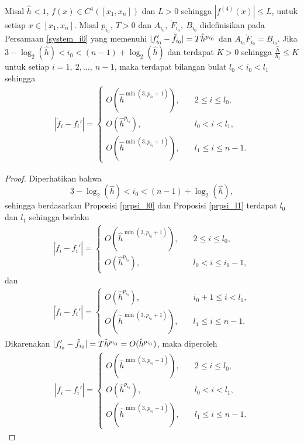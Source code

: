 \begin{akibat}\label{crlyR}
    Misal $\hat{h} < 1$, $f(x) \in C^4([x_{1},x_{n}])$ dan $L > 0$ sehingga \mbox{$|f^{(4)}(x)| \leq L$}, untuk setiap $x\in[x_{1},x_{n}]$. Misal $p_{i_0},~T>0$ dan $A_{i_0},~\dot{F}_{i_0},~B_{i_0}$ didefinisikan pada Persamaan \eqref{system_i0} yang memenuhi $|f_{i_0}'-\Tilde{f}_{i_0}|=T\hat{h}^{p_{i_0}}$ dan $A_{i_0}\dot{F}_{i_0} = B_{i_0}$. Jika $3 - \log_2(\hat{h}) < i_0 < (n - 1) + \log_2(\hat{h})$ dan terdapat $K>0$ sehingga $\frac{\hat{h}}{h_i} \leq K$ untuk setiap $i=1,~2,\dots,~n-1$, maka terdapat bilangan bulat $l_0<i_0<l_1$ sehingga
    \begin{align*}
            |\dot{f}_i-f_i'|=
        \begin{cases}
        O(\hat{h}^{\min(3,p_{i_0}+1)}), \quad &2 \leq i\leq l_0, \\
        O(\hat{h}^{p_{i_0}}), &l_0 < i< l_1,\\
        O(\hat{h}^{\min(3,p_{i_0}+1)}), \quad &l_1 \leq i\leq n-1.
        \end{cases}
    \end{align*}
\end{akibat}

\begin{proof}
    Diperhatikan bahwa 
    $$3 - \log_2(\hat{h}) < i_0 < (n - 1) + \log_2(\hat{h}),$$ 
    sehingga berdasarkan Proposisi \ref{prpsi_l0} dan Proposisi \ref{prpsi_l1} terdapat $l_0$ dan $l_1$ sehingga berlaku
    \begin{align*}
    |\dot{f}_i-f_i'|=
        \begin{cases}
        O(\hat{h}^{\min(3,p_{i_0}+1)}), \quad &2 \leq i\leq l_0,\\
        O(\hat{h}^{p_{i_0}}), &l_0<i\leq i_0-1,
        \end{cases}
    \end{align*}
    dan
    \begin{align*}
    |\dot{f}_i-f_i'|=
        \begin{cases}
        O(\hat{h}^{p_{i_0}}), &i_0 + 1 \leq i< l_1,\\
        O(\hat{h}^{\min(3,p_{i_0}+1)}), \quad &l_1 \leq i\leq n-1.
        \end{cases}
    \end{align*}
    Dikarenakan $|f_{i_0}'-\Tilde{f}_{i_0}|=T\hat{h}^{p_{i_0}} = O(\hat{h}^{p_{i_0}})$, maka diperoleh
    \begin{align*}
            |\dot{f}_i-f_i'|=
        \begin{cases}
        O(\hat{h}^{\min(3,p_{i_0}+1)}), \quad &2 \leq i\leq l_0, \\
        O(\hat{h}^{p_{i_0}}), &l_0 < i< l_1,\\
        O(\hat{h}^{\min(3,p_{i_0}+1)}), \quad &l_1 \leq i\leq n-1.
        \end{cases}
    \end{align*}
\end{proof}

